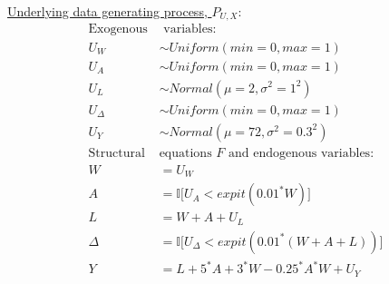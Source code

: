 \documentclass{exam}
\begin{document}
\underline{Underlying data generating process, $P_{U,X}$}:
\begin{align*}
\text{Exogenous} & \text{ variables:} \\
U_{W}& \sim Uniform(min=0, max=1) \\
U_{A} &\sim Uniform(min=0, max=1) \\
U_{L} &\sim Normal(\mu=2, \sigma^2=1^2)\\
U_{\Delta} &\sim Uniform(min=0, max=1) \\
U_{Y} &\sim Normal(\mu= 72, \sigma^2 =0.3^2)  \\
\text{Structural } & \text{equations $F$ and endogenous variables:}  \\
W& = U_W \\
A &  = \mathbb{I}\big[U_A < expit(0.01^*W) \big]\\
L &  = W + A + U_L\\
\Delta & = \mathbb{I} \big[U_{\Delta} < expit(0.01^*(W + A + L)) \big]\\
Y & = L + 5^*A + 3^*W - 0.25^*A^*W + U_Y 
\end{align*}
\end{document}
